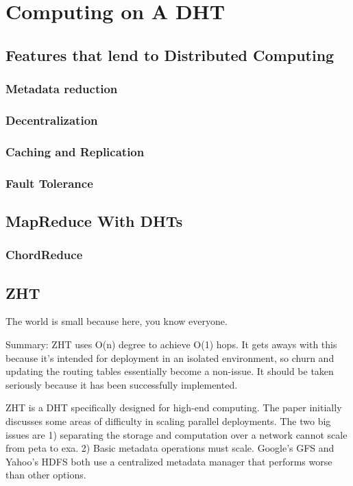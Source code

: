 \documentclass[10pt,letterpaper]{report}
\begin{document}
\chapter{Computing on A DHT}

\section{Features that lend to Distributed Computing}
\subsection{Metadata reduction}
\subsection{Decentralization}
\subsection{Caching and Replication}
\subsection{Fault Tolerance}

\section{MapReduce With DHTs}
\subsection{ChordReduce}

\section{ZHT}
The world is small because here, you know everyone.

Summary: ZHT\cite{li2013zht} uses O(n) degree to achieve O(1) hops.   It gets aways with this because it's intended for deployment in an isolated environment, so churn and updating the routing tables essentially  become a non-issue. It should be taken seriously because it has been successfully implemented.

ZHT is a DHT specifically designed for high-end computing.  The paper initially discusses  some areas of difficulty in scaling parallel deployments.  The two big issues are 1)  separating the storage and computation over a network cannot scale from peta to exa.  2) Basic metadata operations must scale.  Google's GFS and Yahoo's HDFS both use a centralized metadata manager that performs worse than other options.
\end{document}

